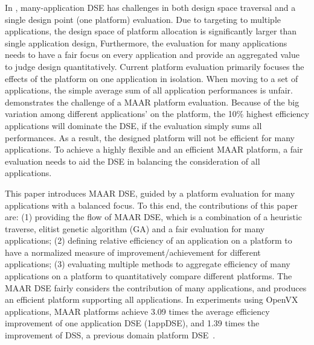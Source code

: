 
In , many-application DSE has challenges in both design space traversal and a single design point (one platform) evaluation. Due to targeting to multiple applications, the design space of platform allocation is significantly larger than single application design,  
Furthermore, the evaluation for many applications needs to have a fair focus on every application and provide an aggregated value to judge design quantitatively. Current platform evaluation primarily focuses the effects of the platform on one application in isolation. When moving to a set of applications, the simple average sum of all application performances is unfair.  demonstrates the challenge of a MAAR platform evaluation. Because of the big variation among different applications'  on the platform, the 10\% highest efficiency applications will dominate the DSE, if the evaluation simply sums all performances. As a result, the designed platform will not be efficient for many  applications. To achieve a highly flexible and an efficient MAAR platform, a fair evaluation needs to aid the DSE in balancing the consideration of all applications.




This paper introduces MAAR DSE, guided by a platform evaluation for many applications with a balanced focus. To this end, the contributions of this paper are: (1) providing the flow of MAAR DSE, which is a combination of a heuristic traverse, elitist genetic algorithm (GA) and a fair evaluation for many applications; (2) defining relative efficiency of an application on a platform to have a normalized measure of improvement/achievement for different applications; (3) evaluating multiple methods to aggregate efficiency of many applications on a platform to quantitatively compare different platforms. The MAAR DSE fairly considers the contribution of many applications, and produces an efficient platform supporting all applications. In experiments using OpenVX applications, MAAR platforms achieve 3.09 times the average efficiency improvement of one application DSE (1appDSE), and 1.39 times the improvement of DSS, a previous domain platform DSE~\cite{zhang2018ds}. 

